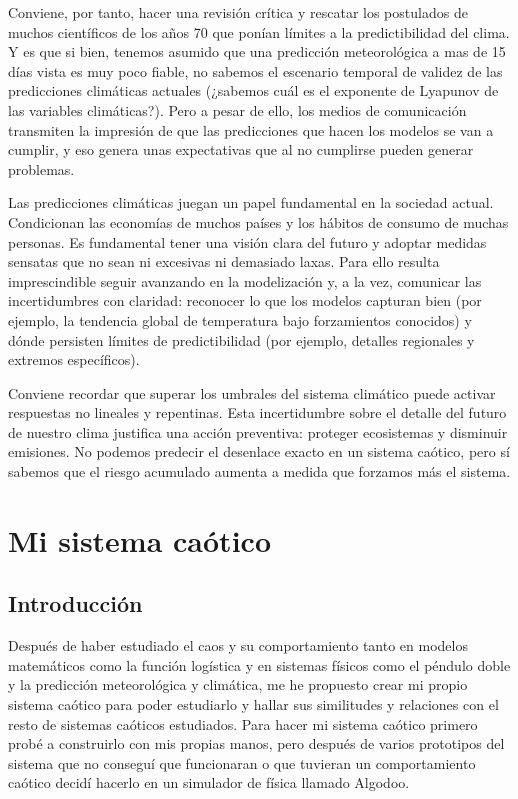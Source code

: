 \documentclass[
  10pt,
  a4paper,
  DIV=11,
  numbers=noendperiod,
  open=any]{scrreprt}
\numberwithin{equation}{chapter}
\numberwithin{equation}{section}
\renewcommand{\[}{\begin{equation}}
\renewcommand{\]}{\end{equation}}
\begin{document}
Conviene, por tanto, hacer una revisión crítica y rescatar los
postulados de muchos científicos de los años 70 que ponían límites a la
predictibilidad del clima. Y es que si bien, tenemos asumido que una
predicción meteorológica a mas de 15 días vista es muy poco fiable, no
sabemos el escenario temporal de validez de las predicciones climáticas
actuales (¿sabemos cuál es el exponente de Lyapunov de las variables
climáticas?). Pero a pesar de ello, los medios de comunicación
transmiten la impresión de que las predicciones que hacen los modelos se
van a cumplir, y eso genera unas expectativas que al no cumplirse pueden
generar problemas.

Las predicciones climáticas juegan un papel fundamental en la sociedad
actual. Condicionan las economías de muchos países y los hábitos de
consumo de muchas personas. Es fundamental tener una visión clara del
futuro y adoptar medidas sensatas que no sean ni excesivas ni demasiado
laxas. Para ello resulta imprescindible seguir avanzando en la
modelización y, a la vez, comunicar las incertidumbres con claridad:
reconocer lo que los modelos capturan bien (por ejemplo, la tendencia
global de temperatura bajo forzamientos conocidos) y dónde persisten
límites de predictibilidad (por ejemplo, detalles regionales y extremos
específicos).

Conviene recordar que superar los umbrales del sistema climático puede activar respuestas no lineales y repentinas. Esta incertidumbre sobre el detalle del futuro de nuestro clima justifica una acción preventiva: proteger ecosistemas y disminuir emisiones. No podemos predecir el desenlace exacto en un sistema caótico, pero sí sabemos que el riesgo acumulado aumenta a medida que forzamos más el sistema.

\part{Mi sistema caótico}

\chapter{Introducción}\label{introducciuxf3n-6}

Después de haber estudiado el caos y su comportamiento tanto en modelos
matemáticos como la función logística y en sistemas físicos como el
péndulo doble y la predicción meteorológica y climática, me he propuesto
crear mi propio sistema caótico para poder estudiarlo y hallar sus
similitudes y relaciones con el resto de sistemas caóticos estudiados.
Para hacer mi sistema caótico primero probé a construirlo con mis
propias manos, pero después de varios prototipos del sistema que no
conseguí que funcionaran o que tuvieran un comportamiento caótico decidí
hacerlo en un simulador de física llamado Algodoo.
\end{document}
